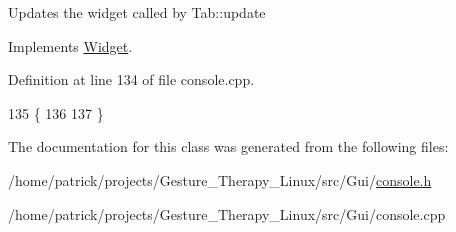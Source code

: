 Updates the widget called by Tab\+::update 

Implements \hyperlink{class_widget_a726dc97add2c6eb82967144207280ace}{Widget}.



Definition at line 134 of file console.\+cpp.


\begin{DoxyCode}
135 \{
136     
137 \}
\end{DoxyCode}


The documentation for this class was generated from the following files\+:\begin{DoxyCompactItemize}
\item 
/home/patrick/projects/\+Gesture\+\_\+\+Therapy\+\_\+\+Linux/src/\+Gui/\hyperlink{console_8h}{console.\+h}\item 
/home/patrick/projects/\+Gesture\+\_\+\+Therapy\+\_\+\+Linux/src/\+Gui/console.\+cpp\end{DoxyCompactItemize}
